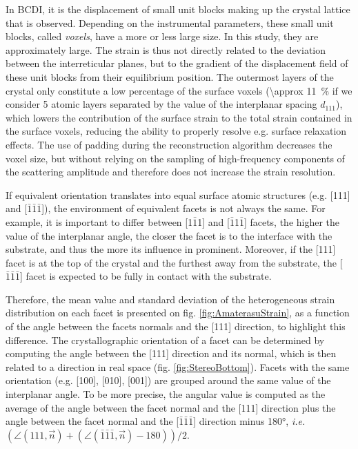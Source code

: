 In BCDI, it is the displacement of small unit blocks making up the crystal lattice that is observed.
Depending on the instrumental parameters, these small unit blocks, called \textit{voxels}, have a more or less large size.
In this study, they are approximately  large.
The strain is thus not directly related to the deviation between the interreticular planes, but to the gradient of the displacement field of these unit blocks from their equilibrium position.
The outermost layers of the crystal only constitute a low percentage of the surface voxels (\qty{\approx 11}{\percent} if we consider 5 atomic layers separated by the value of the interplanar spacing $d_{111}$), which lowers the contribution of the surface strain to the total strain contained in the surface voxels, reducing the ability to properly resolve e.g. surface relaxation effects.
The use of padding during the reconstruction algorithm decreases the voxel size, but without relying on the sampling of high-frequency components of the scattering amplitude and therefore does not increase the strain resolution.


If equivalent orientation translates into equal surface atomic structures (e.g. [111] and [$\bar{1}\bar{1}\bar{1}$]), the environment of equivalent facets is not always the same.
For example, it is important to differ between [1$\bar{1}$1] and [$\bar{1}$1$\bar{1}$] facets, the higher the value of the interplanar angle, the closer the facet is to the interface with the substrate, and thus the more its influence in prominent.
Moreover, if the [111] facet is at the top of the crystal and the furthest away from the substrate, the [$\bar{1}\bar{1}\bar{1}$] facet is expected to be fully in contact with the substrate.

Therefore, the mean value and standard deviation of the heterogeneous strain distribution on each facet is presented on fig. \ref{fig:AmaterasuStrain}, as a function of the angle between the facets normals and the [111] direction, to highlight this difference.
The crystallographic orientation of a facet can be determined by computing the angle between the [111] direction and its normal, which is then related to a direction in real space (fig. \ref{fig:StereoBottom}).
Facets with the same orientation (e.g. [100], [010], [001]) are grouped around the same value of the interplanar angle.
To be more precise, the angular value is computed as the average of the angle between the facet normal and the [111] direction plus the angle between the facet normal and the [$\bar{1}\bar{1}\bar{1}$] direction minus \ang{180}, \textit{i.e.} $(\angle (111, \vec{n}) + (\angle (\bar{1}\bar{1}\bar{1}, \vec{n}) -180))/2$.

